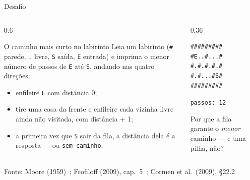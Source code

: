 \documentclass[aspectratio=169]{beamer}
\newcommand{\fonte}[1]{\vfill\hfill{\scriptsize\textcolor{UFSGray}{Fonte: #1}}}
\begin{document}
\begin{frame}[fragile]{Desafio}
  \begin{columns}[T]
    \begin{column}{0.6\textwidth}
      \begin{block}{O caminho mais curto no labirinto}
        \small Leia um labirinto (\texttt{\#} parede, \texttt{.} livre,
        \texttt{S} saída, \texttt{E} entrada) e imprima o menor número de
        passos de \texttt{E} até \texttt{S}, andando nas quatro direções:
        \vspace{-0.3em}
        \begin{itemize}
          \item enfileire \texttt{E} com distância 0;
          \item tire uma casa da frente e enfileire cada vizinha livre ainda
            não visitada, com distância + 1;
          \item a primeira vez que \texttt{S} sair da fila, a distância dela
            é a resposta --- ou \texttt{sem caminho}.
        \end{itemize}
      \end{block}
    \end{column}
    \begin{column}{0.36\textwidth}
\begin{lstlisting}[style=shellStyle, language={}]
#########
#E..#...#
#.#.#.#.#
#.#...#S#
#########
\end{lstlisting}
      \centering\scriptsize \texttt{passos: 12}

      \medskip
      \raggedright Por que a fila garante o \emph{menor} caminho --- e uma
      pilha, não?
    \end{column}
  \end{columns}
  \fonte{Moore (1959)~\cite{moore1959shortest};
    Feofiloff (2009), cap.~5~\cite{feofiloff2009algoritmos};
    Cormen et al.\ (2009), §22.2~\cite{cormen2009introduction}}
\end{frame}
\end{document}
